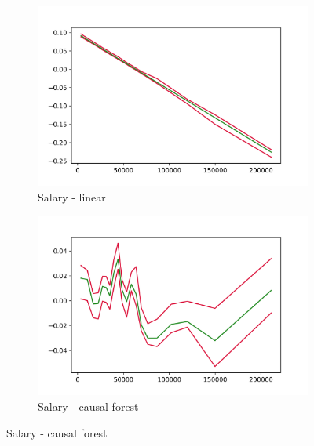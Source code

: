 \begin{figure}[h]
    \begin{subfigure}{0.5\linewidth}
        \includegraphics[width=\linewidth]{figures/ALE/chFDexp/spec3_linear_FSALARYM.png}
        \caption{Salary - linear}
    \end{subfigure}%
    \begin{subfigure}{0.5\linewidth}
        \includegraphics[width=\linewidth]{figures/ALE/chFDexp/spec3_cf_FSALARYM.png}
        \caption{Salary - causal forest}
    \end{subfigure}


\end{figure}
